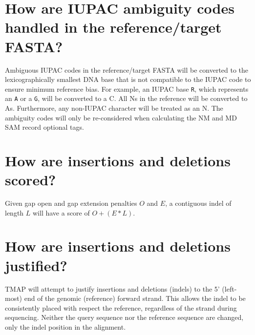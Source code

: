 \documentclass[a4paper,12pt]{book}
\newcommand{\TT}[1]{{\tt #1}} %
\begin{document}
\mtcaddchapter 
\minitoc

\section{How are IUPAC ambiguity codes handled in the reference/target FASTA?}
\label{sec:iupac}
Ambiguous IUPAC codes in the reference/target FASTA will be converted to the lexicographically smallest DNA base that is not compatible to the IUPAC code to ensure minimum reference bias.
For example, an IUPAC base \TT{R}, which represents an \TT{A} or a \TT{G}, will be converted to a C.
All Ns in the reference will be converted to As.
Furthermore, any non-IUPAC character will be treated as an N.
The ambiguity codes will only be re-considered when calculating the NM and MD SAM record optional tags.

\section{How are insertions and deletions scored?}
\label{sec:indel-scoring}
Given gap open and gap extension penalties $O$ and $E$, a contiguous indel of length $L$ will have a score of $O + (E * L)$.

\section{How are insertions and deletions justified?}
\label{sec:indel-justification}
TMAP will attempt to justify insertions and deletions (indels) to the 5' (left-most) end of the genomic (reference) forward strand.
This allows the indel to be consistently placed with respect the reference, regardless of the strand during sequencing.
Neither the query sequence nor the reference sequence are changed, only the indel position in the alignment.
\end{document}
